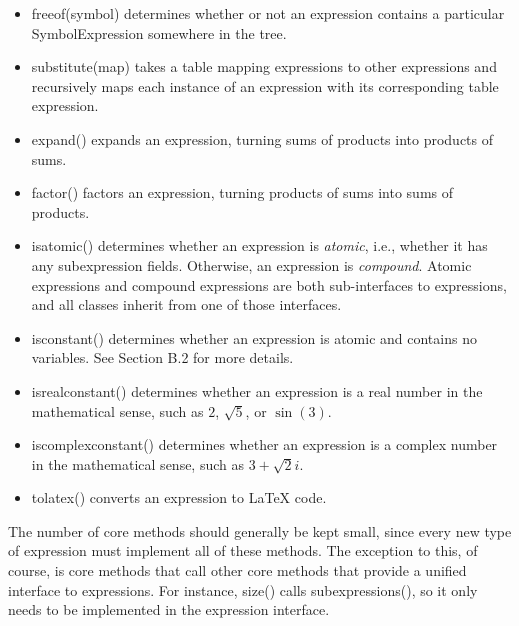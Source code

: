 \documentclass{article}
\begin{document}
\begin{itemize}
    \item {\ttfamily freeof(symbol)} determines whether or not an expression contains a particular \\ {\ttfamily SymbolExpression} somewhere in the tree.
    
    \item {\ttfamily substitute(map)} takes a table mapping expressions to other expressions and recursively maps each instance of an expression with its corresponding table expression.
    
    \item {\ttfamily expand()} expands an expression, turning sums of products into products of sums.
    
    \item {\ttfamily factor()} factors an expression, turning products of sums into sums of products.
    
    \item {\ttfamily isatomic()} determines whether an expression is \emph{atomic}, i.e., whether it has any subexpression fields. Otherwise, an expression is \emph{compound}. Atomic expressions and compound expressions are both sub-interfaces to expressions, and all classes inherit from one of those interfaces.
    
    \item {\ttfamily isconstant()} determines whether an expression is atomic and contains no variables. See Section B.2 for more details.
    
    \item {\ttfamily isrealconstant()} determines whether an expression is a real number in the mathematical sense, such as $2$, $\sqrt{5}$, or $\sin(3)$.
    
    \item {\ttfamily iscomplexconstant()} determines whether an expression is a complex number in the mathematical sense, such as $3 + \sqrt{2}i$.
    
    \item {\ttfamily tolatex()} converts an expression to \LaTeX{} code.
\end{itemize}

The number of core methods should generally be kept small, since every new type of expression must implement all of these methods. The exception to this, of course, is core methods that call other core methods that provide a unified interface to expressions. For instance, {\ttfamily size()} calls {\ttfamily subexpressions()}, so it only needs to be implemented in the expression interface.
\end{document}
